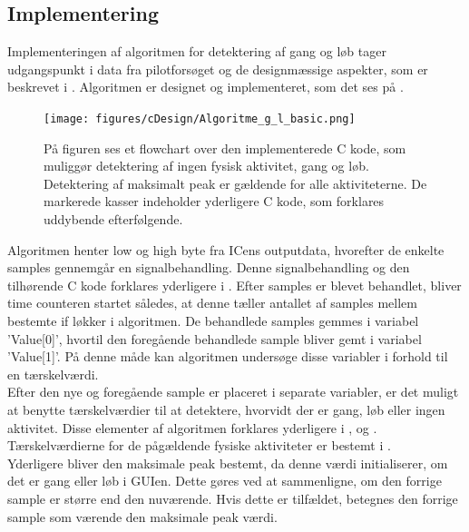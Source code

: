 \subsection{Implementering}
Implementeringen af algoritmen for detektering af gang og løb tager udgangspunkt i data fra pilotforsøget og de designmæssige aspekter, som er beskrevet i . Algoritmen er designet og implementeret, som det ses på .
\begin{figure}[H]
	\centering
	\texttt{[image: figures/cDesign/Algoritme\_g\_l\_basic.png]}
	\caption{På figuren ses et flowchart over den implementerede C kode, som muliggør detektering af ingen fysisk aktivitet, gang og løb. Detektering af maksimalt peak er gældende for alle aktiviteterne. De markerede kasser indeholder yderligere C kode, som forklares uddybende efterfølgende.}
	\label{fig:basic_algo_g_l}
\end{figure}\vspace{-0.25cm}
Algoritmen henter low og high byte fra ICens outputdata, hvorefter de enkelte samples gennemgår en signalbehandling. Denne signalbehandling og den tilhørende C kode forklares yderligere i . Efter samples er blevet behandlet, bliver time counteren startet således, at denne tæller antallet af samples mellem bestemte if løkker i algoritmen. De behandlede samples gemmes i variabel 'Value[0]', hvortil den foregående behandlede sample bliver gemt i variabel 'Value[1]'. På denne måde kan algoritmen undersøge disse variabler i forhold til en tærskelværdi. \\
Efter den nye og foregående sample er placeret i separate variabler, er det muligt at benytte tærskelværdier til at detektere, hvorvidt der er gang, løb eller ingen aktivitet. Disse elementer af algoritmen forklares yderligere i ,  og . Tærskelværdierne for de pågældende fysiske aktiviteter er bestemt i . \\ 
Yderligere bliver den maksimale peak bestemt, da denne værdi initialiserer, om det er gang eller løb i GUIen. Dette gøres ved at sammenligne, om den forrige sample er større end den nuværende. Hvis dette er tilfældet, betegnes den forrige sample som værende den maksimale peak værdi. %

